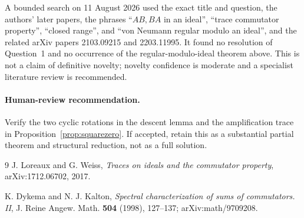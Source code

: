 \documentclass[11pt]{article}
\theoremstyle{remark}
\begin{document}
A bounded search on 11 August 2026 used the exact title and question, the
authors' later papers, the phrases ``$AB,BA$ in an ideal'', ``trace commutator
property'', ``closed range'', and ``von Neumann regular modulo an ideal'', and
the related arXiv papers 2103.09215 and 2203.11995.  It found no resolution of
Question~1 and no occurrence of the regular-modulo-ideal theorem above.  This
is not a claim of definitive novelty; novelty confidence is moderate and a
specialist literature review is recommended.

\paragraph{Human-review recommendation.}
Verify the two cyclic rotations in the descent lemma and the amplification
trace in Proposition~\ref{prop:squarezero}.  If accepted, retain this as a
substantial partial theorem and structural reduction, not as a full solution.

\begin{thebibliography}{9}
J. Loreaux and G. Weiss,
\emph{Traces on ideals and the commutator property},
arXiv:1712.06702, 2017.

K. Dykema and N. J. Kalton,
\emph{Spectral characterization of sums of commutators. II},
J. Reine Angew. Math. \textbf{504} (1998), 127--137;
arXiv:math/9709208.
\end{thebibliography}
\end{document}
